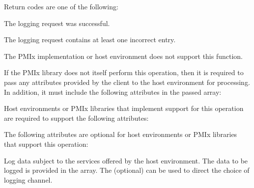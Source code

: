 Return codes are one of the following:

\begin{constantdesc}
    \item {} The logging request was successful.
    \item {} The logging request contains at least one incorrect entry.
    \item {} The \ac{PMIx} implementation or host environment does not support this function.
\end{constantdesc}

\reqattrstart
If the \ac{PMIx} library does not itself perform this operation, then it is required to pass any attributes provided by the client to the host environment for processing. In addition, it must include the following attributes in the passed  array:


\divider

Host environments or \ac{PMIx} libraries that implement support for this operation are required to support the following attributes:


\reqattrend

\optattrstart
The following attributes are optional for host environments or \ac{PMIx} libraries that support this operation:


\optattrend

\descr

Log data subject to the services offered by the host environment. The data to be logged is provided in the  array. The (optional)  can be used to direct the choice of logging channel.

